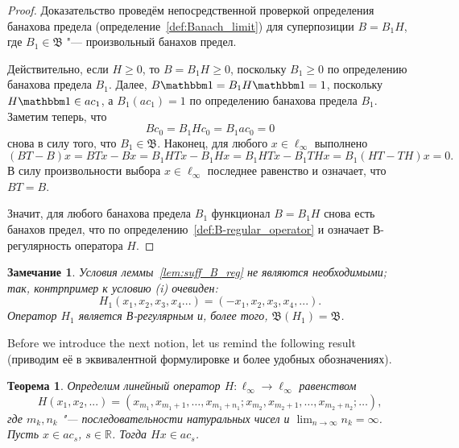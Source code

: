 \documentclass[a4paper,14pt]{article} %
\newcommand{\R}{\ensuremath{\mathbb{R}}}
\newcommand{\B}{\ensuremath{\mathfrak{B}}}
\newcommand{\one}{\ensuremath{\mathbbm 1}}
\theoremstyle{plain}
\newtheorem{theorem}[lemma]{Теорема}
\newtheorem{remark}[lemma]{Замечание}
\begin{document}
	\begin{proof}
		Доказательство проведём непосредственной проверкой определения банахова предела
		(определение~\ref{def:Banach_limit})
		для суперпозиции $B = B_1 H$,
		где $B_1 \in \B$ "--- произвольный банахов предел.

		Действительно, если $H\geq 0$, то $B = B_1 H \geq 0$,
		поскольку $B_1 \geq 0$ по определению банахова предела $B_1$.
		Далее, $B\one = B_1 H \one = 1$, поскольку $H\one \in ac_1$,
		а $B_1(ac_1) = 1$ по определению банахова предела $B_1$.
		Заметим теперь, что
		\begin{equation}
			Bc_0 = B_1 H c_0 = B_1 ac_0 = 0
		\end{equation}
		снова в силу того, что $B_1\in\B$.
		Наконец, для любого $x\in\ell_\infty$ выполнено
		\begin{equation}
			(BT-B)x = BTx - Bx = B_1 HTx - B_1 H x = B_1 HTx - B_1 T H x = B_1 (HT -  T H) x = 0
			.
		\end{equation}
		В силу произвольности выбора $x\in \ell_\infty$ последнее равенство и означает, что $BT=B$.

		Значит, для любого банахова предела $B_1$ функционал $B=B_1 H$ снова есть банахов предел,
		что по определению~\ref{def:B-regular_operator}
		и означает В-регулярность оператора $H$.
	\end{proof}

	\begin{remark}
		Условия леммы~\ref{lem:suff_B_reg} не являются необходимыми;
		так, контрпример к условию (i) очевиден:
		\begin{equation}
			H_1(x_1,x_2,x_3,x_4...) = (-x_1, x_2, x_3, x_4, ...)
			.
		\end{equation}
		Оператор $H_1$ является В-регулярным и, более того, $\B(H_1) = \B$.
	\end{remark}


	Before we introduce the next notion, let us remind the following result~\cite[теорема 1]{usachev2008transforms} (приводим её в эквивалентной формулировке и более удобных обозначениях).


	\begin{theorem}
		Определим линейный оператор $H:\ell_\infty\to\ell_\infty$ равенством
		\begin{equation}
			H(x_1, x_2, ...) = \left(x_{m_1}, x_{m_1+1}, \ldots, x_{m_1+n_1} ; x_{m_2}, x_{m_2+1}, \ldots, x_{m_2+n_2} ; \ldots\right)
			,
		\end{equation}
		где $m_k, n_k$ "--- последовательности натуральных чисел и $\lim_{n\to\infty} n_k = \infty$.
		Пусть $x\in ac_s$, $s\in\R$. Тогда $Hx \in ac_s$.
	\end{theorem}
\end{document}
